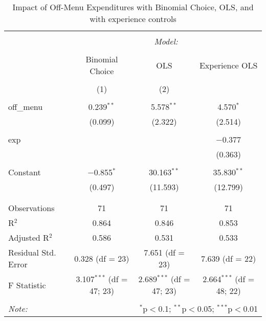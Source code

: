 \begin{table}[H] \centering 
  \caption{Impact of Off-Menu Expenditures with Binomial Choice, OLS, and with experience controls} 
  \label{} 
\begin{tabular}{@{\extracolsep{5pt}}lccc} 
\\[-1.8ex]\hline 
\hline \\[-1.8ex] 
 & \multicolumn{3}{c}{\textit{Model:}} \\ 
\cline{2-4} 
\\[-1.8ex] & Binomial Choice & OLS & Experience OLS\\ 
\\[-1.8ex] & (1) & (2)\\ 
\hline \\[-1.8ex] 
 off\_menu & 0.239$^{**}$ & 5.578$^{**}$ & 4.570$^{*}$ \\ 
  & (0.099) & (2.322) & (2.514) \\ 
  & & & \\ 
 exp &  &  & $-$0.377 \\ 
  &  &  & (0.363) \\ 
  & & & \\ 
 Constant & $-$0.855$^{*}$ & 30.163$^{**}$ & 35.830$^{**}$ \\ 
  & (0.497) & (11.593) & (12.799) \\ 
  & & & \\ 
\hline \\[-1.8ex] 
Observations & 71 & 71 & 71 \\ 
R$^{2}$ & 0.864 & 0.846 & 0.853 \\ 
Adjusted R$^{2}$ & 0.586 & 0.531 & 0.533 \\ 
Residual Std. Error & 0.328 (df = 23) & 7.651 (df = 23) & 7.639 (df = 22) \\ 
F Statistic & 3.107$^{***}$ (df = 47; 23) & 2.689$^{***}$ (df = 47; 23) & 2.664$^{***}$ (df = 48; 22) \\ 
\hline 
\hline \\[-1.8ex] 
\textit{Note:}  & \multicolumn{3}{r}{$^{*}$p$<$0.1; $^{**}$p$<$0.05; $^{***}$p$<$0.01} \\ 
\end{tabular} 
\end{table} 

